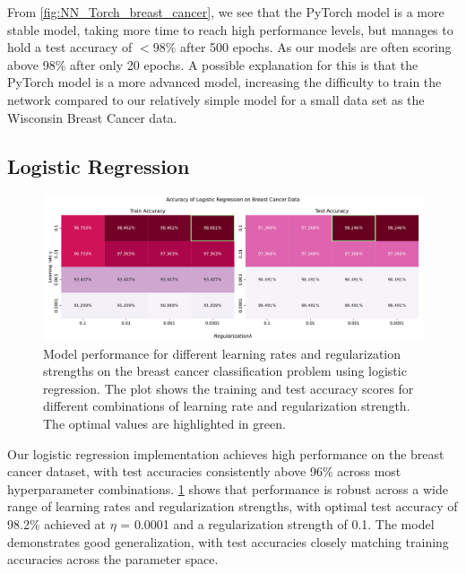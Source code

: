 \documentclass[aps,pra,english,notitlepage,reprint,nofootinbib]{revtex4-1}  %
\begin{document}
From \cref{fig:NN_Torch_breast_cancer}, we see that the PyTorch model is a more stable model, taking more time to reach high performance levels, but manages to hold a test accuracy of $<98\%$ after 500 epochs. As our models are often scoring above 98\% after only 20 epochs. A possible explanation for this is that the PyTorch model is a more advanced model, increasing the difficulty to train the network compared to our relatively simple model for a small data set as the Wisconsin Breast Cancer data.

\subsection{Logistic Regression}

\onecolumngrid
\begin{figure}[h!]
    \centering
    \includegraphics[width = .9\textwidth]{../figs/logistic_regression_gridsearch.pdf}
    \caption{Model performance for different learning rates and regularization strengths on the breast cancer classification problem using logistic regression. The plot shows the training and test accuracy scores for different combinations of learning rate and regularization strength. The optimal values are highlighted in green.}
    \label{fig:logistic_regression_gridsearch}
\end{figure}
\twocolumngrid

Our logistic regression implementation achieves high performance on the breast cancer dataset, with test accuracies consistently above 96\% across most hyperparameter combinations. \cref{fig:logistic_regression_gridsearch} shows that performance is robust across a wide range of learning rates and regularization strengths, with optimal test accuracy of 98.2\% achieved at $\eta$ = 0.0001 and a regularization strength of 0.1. The model demonstrates good generalization, with test accuracies closely matching training accuracies across the parameter space.
\end{document}
